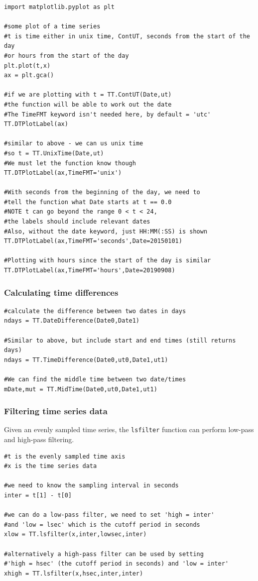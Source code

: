 \begin{verbatim}
import matplotlib.pyplot as plt

#some plot of a time series
#t is time either in unix time, ContUT, seconds from the start of the day
#or hours from the start of the day
plt.plot(t,x) 
ax = plt.gca()

#if we are plotting with t = TT.ContUT(Date,ut) 
#the function will be able to work out the date
#The TimeFMT keyword isn't needed here, by default = 'utc'
TT.DTPlotLabel(ax)

#similar to above - we can us unix time
#so t = TT.UnixTime(Date,ut)
#We must let the function know though
TT.DTPlotLabel(ax,TimeFMT='unix')

#With seconds from the beginning of the day, we need to
#tell the function what Date starts at t == 0.0
#NOTE t can go beyond the range 0 < t < 24,
#the labels should include relevant dates
#Also, without the date keyword, just HH:MM(:SS) is shown
TT.DTPlotLabel(ax,TimeFMT='seconds',Date=20150101)

#Plotting with hours since the start of the day is similar
TT.DTPlotLabel(ax,TimeFMT='hours',Date=20190908)
\end{verbatim}

\subsubsection{Calculating time differences}

\begin{verbatim}
#calculate the difference between two dates in days
ndays = TT.DateDifference(Date0,Date1)

#Similar to above, but include start and end times (still returns days)
ndays = TT.TimeDifference(Date0,ut0,Date1,ut1)

#We can find the middle time between two date/times
mDate,mut = TT.MidTime(Date0,ut0,Date1,ut1)
\end{verbatim}

\subsubsection{Filtering time series data}

Given an evenly sampled time series, the \texttt{lsfilter} function can perform low-pass and high-pass filtering.

\begin{verbatim}
#t is the evenly sampled time axis
#x is the time series data

#we need to know the sampling interval in seconds
inter = t[1] - t[0]

#we can do a low-pass filter, we need to set 'high = inter'
#and 'low = lsec' which is the cutoff period in seconds
xlow = TT.lsfilter(x,inter,lowsec,inter)

#alternatively a high-pass filter can be used by setting
#'high = hsec' (the cutoff period in seconds) and 'low = inter'
xhigh = TT.lsfilter(x,hsec,inter,inter)
\end{verbatim}

